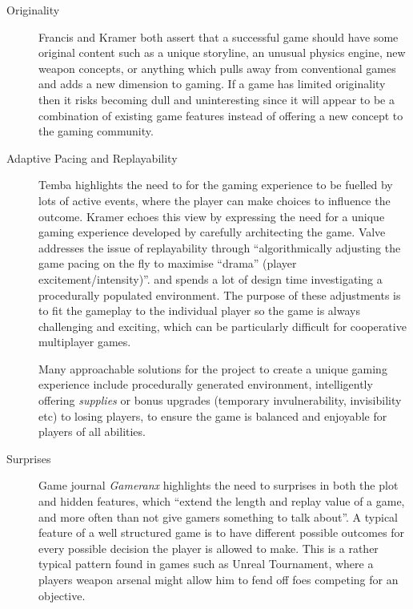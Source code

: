 \begin{description}

\item[Originality] Francis and Kramer both assert that a successful game should have some original content such as a unique storyline, an unusual physics engine, new weapon concepts, or anything which pulls away from conventional games and adds a new dimension to gaming. If a game has limited originality then it risks becoming dull and uninteresting since it will appear to be a combination of existing game features instead of offering a new concept to the gaming community.\cite{tomfrancis} \cite{wolfgangkramer} 

\item[Adaptive Pacing and Replayability] Temba highlights the need to for the gaming experience to be fuelled by lots of active events, where the player can make choices to influence the outcome. Kramer echoes this view by expressing the need for a unique gaming experience developed by carefully architecting the game. \cite{antontemba} \cite{wolfgangkramer} Valve addresses the issue of replayability through ``algorithmically adjusting the game pacing on the fly to maximise ``drama'' (player excitement/intensity)''.\cite{valveAI} and spends a lot of design time investigating a procedurally populated environment. The purpose of these adjustments is to fit the gameplay to the individual player so the game is always challenging and exciting, which can be particularly difficult for cooperative multiplayer games.

Many approachable solutions for the project to create a unique gaming experience include procedurally generated environment, intelligently offering \emph{supplies} or bonus upgrades (temporary invulnerability, invisibility etc) to losing players, to ensure the game is balanced and enjoyable for players of all abilities.

\item[Surprises] Game journal \emph{Gameranx} highlights the need to surprises in both the plot and hidden features, which ``extend the length and replay value of a game, and more often than not give gamers something to talk about''.\cite{gameranx} A typical feature of a well structured game is to have different possible outcomes for every possible decision the player is allowed to make. This is a rather typical pattern found in games such as Unreal Tournament, where a players weapon arsenal might allow him to fend off foes competing for an objective.


\end{description}
